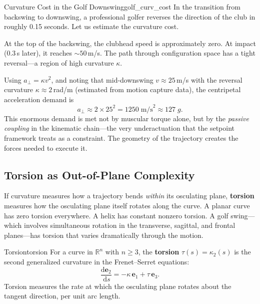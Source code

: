 \documentclass[12pt, openany]{book}
\theoremstyle{plain}
\newcommand{\Reals}{\mathbb{R}}
\newcommand{\dd}{\mathrm{d}}
\newcommand{\ds}{\,\dd s}
\newcommand{\tangent}{\bm{e}_1}
\newcommand{\normal}{\bm{e}_2}
\newcommand{\binormal}{\bm{e}_3}
\begin{document}
\begin{example}{Curvature Cost in the Golf Downswing}{golf_curv_cost}
  In the transition from backswing to downswing, a professional golfer reverses
  the direction of the club in roughly 0.15 seconds. Let us estimate the
  curvature cost.

  At the top of the backswing, the clubhead speed is approximately zero. At
  impact (0.3\,s later), it reaches $\sim\!50$\,m/s. The path through
  configuration space has a tight reversal---a region of high curvature
  $\kappa$.

  Using $a_\perp = \kappa v^2$, and noting that mid-downswing
  $v \approx 25$\,m/s with the reversal curvature $\kappa \approx 2$\,rad/m
  (estimated from motion capture data), the centripetal acceleration demand is
  \begin{equation}
    a_\perp \approx 2 \times 25^2 = 1250\;\text{m/s}^2 \approx 127\;g.
  \end{equation}
  This enormous demand is met not by muscular torque alone, but by the
  \emph{passive coupling} in the kinematic chain---the very underactuation
  that the setpoint framework treats as a constraint. The geometry of the
  trajectory creates the forces needed to execute it.
\end{example}

\subsection{Torsion as Out-of-Plane Complexity}

If curvature measures how a trajectory bends \emph{within} its osculating
plane, \textbf{torsion} measures how the osculating plane itself rotates along
the curve. A planar curve has zero torsion everywhere. A helix has constant
nonzero torsion. A golf swing---which involves simultaneous rotation in the
transverse, sagittal, and frontal planes---has torsion that varies dramatically
through the motion.

\begin{definition}{Torsion}{torsion}
  For a curve in $\Reals^n$ with $n \geq 3$, the \textbf{torsion}
  $\tau(s) = \kappa_2(s)$ is the second generalized curvature in the
  Frenet--Serret equations:
  \begin{equation}
    \frac{\dd\normal}{\ds} = -\kappa\, \tangent + \tau\, \binormal.
  \end{equation}
  Torsion measures the rate at which the osculating plane rotates about the
  tangent direction, per unit arc length.
\end{definition}
\end{document}
